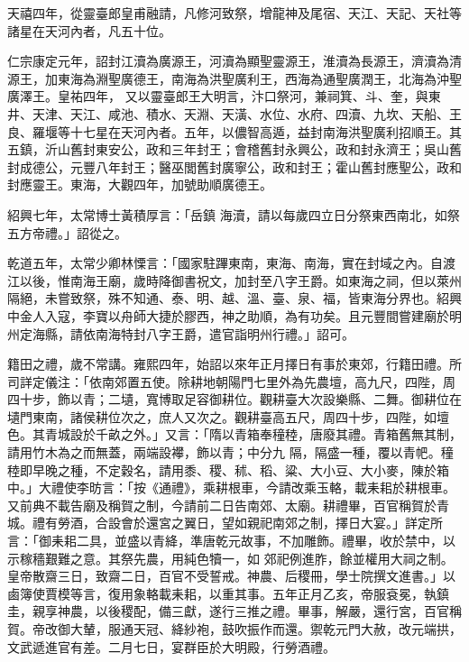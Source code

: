 \begin{pinyinscope}
 天禧四年，從靈臺郎皇甫融請，凡修河致祭，增龍神及尾宿、天江、天記、天社等諸星在天河內者，凡五十位。



 仁宗康定元年，詔封江瀆為廣源王，河瀆為顯聖靈源王，淮瀆為長源王，濟瀆為清源王，加東海為淵聖廣德王，南海為洪聖廣利王，西海為通聖廣潤王，北海為沖聖廣澤王。皇祐四年，
 又以靈臺郎王大明言，汴口祭河，兼祠箕、斗、奎，與東井、天津、天江、咸池、積水、天淵、天潢、水位、水府、四瀆、九坎、天船、王良、羅堰等十七星在天河內者。五年，以儂智高遁，益封南海洪聖廣利招順王。其五鎮，沂山舊封東安公，政和三年封王；會稽舊封永興公，政和封永濟王；吳山舊封成德公，元豐八年封王；醫巫閭舊封廣寧公，政和封王；霍山舊封應聖公，政和封應靈王。東海，大觀四年，加號助順廣德王。



 紹興七年，太常博士黃積厚言：「岳鎮
 海瀆，請以每歲四立日分祭東西南北，如祭五方帝禮。」詔從之。



 乾道五年，太常少卿林慄言：「國家駐蹕東南，東海、南海，實在封域之內。自渡江以後，惟南海王廟，歲時降御書祝文，加封至八字王爵。如東海之祠，但以萊州隔絕，未嘗致祭，殊不知通、泰、明、越、溫、臺、泉、福，皆東海分界也。紹興中金人入寇，李寶以舟師大捷於膠西，神之助順，為有功矣。且元豐間嘗建廟於明州定海縣，請依南海特封八字王爵，遣官詣明州行禮。」詔可。



 籍田之禮，歲不常講。雍熙四年，始詔以來年正月擇日有事於東郊，行籍田禮。所司詳定儀注：「依南郊置五使。除耕地朝陽門七里外為先農壇，高九尺，四陛，周四十步，飾以青；二壝，寬博取足容御耕位。觀耕臺大次設樂縣、二舞。御耕位在壝門東南，諸侯耕位次之，庶人又次之。觀耕臺高五尺，周四十步，四陛，如壇色。其青城設於千畝之外。」又言：「隋以青箱奉穜稑，唐廢其禮。青箱舊無其制，請用竹木為之而無蓋，兩端設襻，飾以青；中分九
 隔，隔盛一種，覆以青帊。穜稑即早晚之種，不定穀名，請用黍、稷、秫、稻、粱、大小豆、大小麥，陳於箱中。」大禮使李昉言：「按《通禮》，乘耕根車，今請改乘玉輅，載耒耜於耕根車。又前典不載告廟及稱賀之制，今請前二日告南郊、太廟。耕禮畢，百官稱賀於青城。禮有勞酒，合設會於還宮之翼日，望如親祀南郊之制，擇日大宴。」詳定所言：「御耒耜二具，並盛以青絳，準唐乾元故事，不加雕飾。禮畢，收於禁中，以示稼穡艱難之意。其祭先農，用純色犢一，如
 郊祀例進胙，餘並權用大祠之制。皇帝散齋三日，致齋二日，百官不受誓戒。神農、后稷冊，學士院撰文進書。」以鹵簿使賈模等言，復用象輅載耒耜，以重其事。五年正月乙亥，帝服袞冕，執鎮圭，親享神農，以後稷配，備三獻，遂行三推之禮。畢事，解嚴，還行宮，百官稱賀。帝改御大輦，服通天冠、絳紗袍，鼓吹振作而還。禦乾元門大赦，改元端拱，文武遞進官有差。二月七日，宴群臣於大明殿，行勞酒禮。




\end{pinyinscope}
